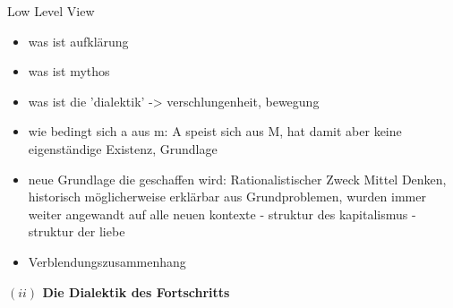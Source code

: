 \documentclass[a4paper, 12pt]{article}
\begin{document}
\begin{onehalfspace}
Low Level View

\begin{itemize}
  \item was ist aufklärung
  \item was ist mythos
  \item was ist die 'dialektik' -> verschlungenheit, bewegung
  \item wie bedingt sich a aus m:  A speist sich aus M, hat damit aber keine eigenständige Existenz, Grundlage
  \item neue Grundlage die geschaffen wird: Rationalistischer Zweck Mittel Denken, historisch möglicherweise erklärbar aus Grundproblemen, wurden immer weiter angewandt auf alle neuen kontexte - struktur des kapitalismus - struktur der liebe
  \item Verblendungszusammenhang
\end{itemize}


\vspace{5mm}
\noindent\textbf{$(ii)$ Die Dialektik des Fortschritts}

\noindent 


\end{onehalfspace}
\end{document}
